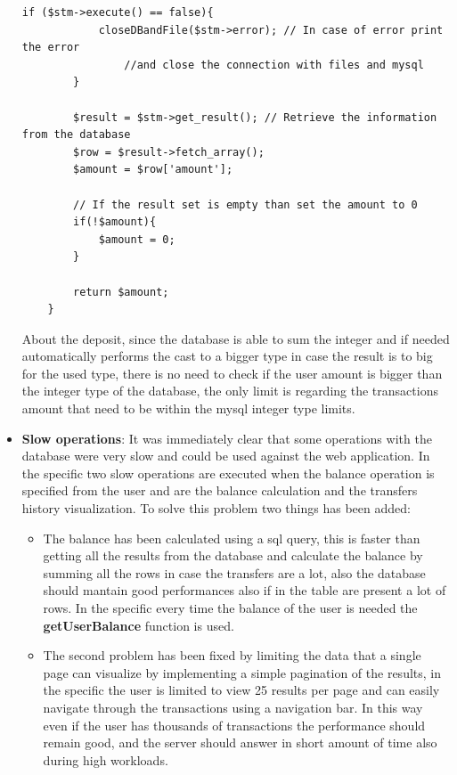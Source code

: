 \documentclass[14pt]{article}
\begin{document}
\begin{itemize}
\begin{Verbatim}[tabsize=4]
		if ($stm->execute() == false){
			closeDBandFile($stm->error); // In case of error print the error 
				//and close the connection with files and mysql 
		}
		
		$result = $stm->get_result(); // Retrieve the information from the database
		$row = $result->fetch_array();
		$amount = $row['amount'];  
		
		// If the result set is empty than set the amount to 0
		if(!$amount){
			$amount = 0;
		}
	
		return $amount;
	}
	\end{Verbatim}
	About the deposit, since the database is able to sum the integer and if needed automatically performs the cast to a bigger type in case the result is to big for the used type, there is no need to check if the user amount is bigger than the integer type of the database, the only limit is regarding the transactions amount that need to be within the mysql integer type limits. 
	
	\item \textbf{Slow operations}: It was immediately clear that some operations with the database were very slow and could be used against the web application. In the specific two slow operations are executed when the balance operation is specified from the user and are the balance calculation and the transfers history visualization. To solve this problem two things has been added:
	\begin{itemize}
		\item The balance has been calculated using a sql query, this is faster than getting all the results from the database and calculate the balance by summing all the rows in case the transfers are a lot, also the database should mantain good performances also if in the table are present a lot of rows. In the specific every time the balance of the user is needed the \textbf{getUserBalance} function is used.
		
		\item The second problem has been fixed by limiting the data that a single page can visualize by implementing a simple pagination of the results, in the specific the user is limited to view 25 results per page and can easily navigate through the transactions using a navigation bar. In this way even if the user has thousands of transactions the performance should remain good, and the server should answer in short amount of time also during high workloads.
	\end{itemize}
	

\end{itemize}
\end{document}
